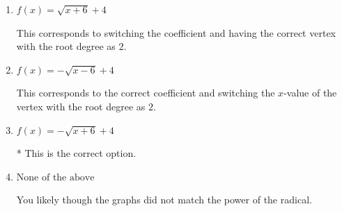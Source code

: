 \documentclass{extbook}[14pt]
\begin{document}
\begin{enumerate}
{\begin{enumerate}[label=\Alph*.]
This corresponds to switching the coefficient AND switching the $x$-value of the vertex with the root degree as $2$.
\item \( f(x) = \sqrt{x + 6} + 4 \)

This corresponds to switching the coefficient and having the correct vertex with the root degree as $2$.
\item \( f(x) = - \sqrt{x - 6} + 4 \)

This corresponds to the correct coefficient and switching the $x$-value of the vertex with the root degree as $2$.
\item \( f(x) = - \sqrt{x + 6} + 4 \)

* This is the correct option.
\item \( \text{None of the above} \)

You likely though the graphs did not match the power of the radical.
\end{enumerate}

}
\end{enumerate}
\end{document}
